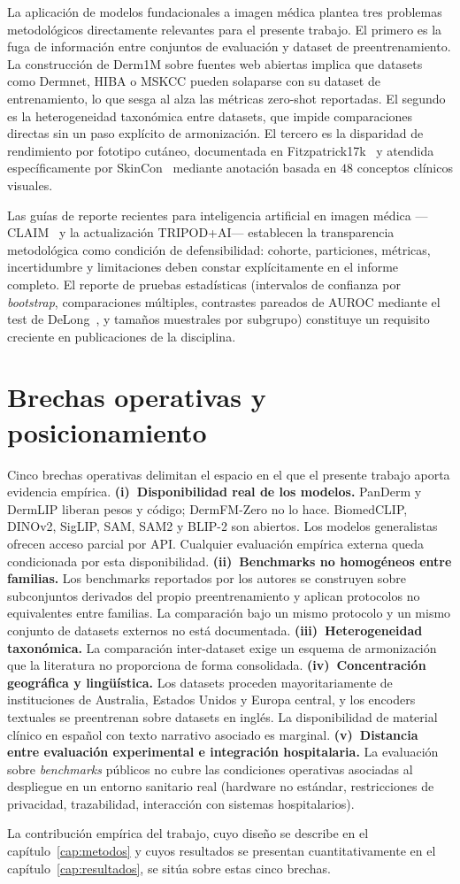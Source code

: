 La aplicación de modelos fundacionales a imagen médica plantea tres
problemas metodológicos directamente relevantes para el presente
trabajo. El primero es la fuga de información entre conjuntos de
evaluación y dataset de preentrenamiento. La construcción de Derm1M
sobre fuentes web abiertas implica que datasets como Dermnet, HIBA
o MSKCC pueden solaparse con su dataset de entrenamiento, lo que
sesga al alza las métricas zero-shot reportadas. El segundo es la
heterogeneidad taxonómica entre datasets, que impide comparaciones
directas sin un paso explícito de armonización. El tercero es la
disparidad de rendimiento por fototipo cutáneo, documentada en
Fitzpatrick17k~\cite{fitzpatrick17k} y atendida específicamente por
SkinCon~\cite{skincon} mediante anotación basada en $48$
conceptos clínicos visuales.

Las guías de reporte recientes para inteligencia artificial en
imagen médica ---CLAIM~\cite{claim2024} y la actualización
TRIPOD+AI--- establecen la transparencia metodológica como
condición de defensibilidad: cohorte, particiones, métricas,
incertidumbre y limitaciones deben constar explícitamente en el
informe completo. El reporte de pruebas estadísticas (intervalos de
confianza por \emph{bootstrap}, comparaciones múltiples,
contrastes pareados de AUROC mediante el test de
DeLong~\cite{delong1988}, y tamaños muestrales por subgrupo)
constituye un requisito creciente en publicaciones de la disciplina.

\section{Brechas operativas y posicionamiento}
\label{sec:brecha}

Cinco brechas operativas delimitan el espacio en el que el presente
trabajo aporta evidencia empírica. \textbf{(i)~Disponibilidad real
de los modelos.} PanDerm y DermLIP liberan pesos y código;
DermFM-Zero no lo hace. BiomedCLIP, DINOv2, SigLIP, SAM, SAM2 y
BLIP-2 son abiertos. Los modelos generalistas ofrecen acceso parcial
por API. Cualquier evaluación empírica externa queda condicionada
por esta disponibilidad. \textbf{(ii)~Benchmarks no homogéneos entre
familias.} Los benchmarks reportados por los autores se construyen
sobre subconjuntos derivados del propio preentrenamiento y aplican
protocolos no equivalentes entre familias. La comparación bajo un
mismo protocolo y un mismo conjunto de datasets externos no está
documentada. \textbf{(iii)~Heterogeneidad taxonómica.} La
comparación inter-dataset exige un esquema de armonización que la
literatura no proporciona de forma consolidada.
\textbf{(iv)~Concentración geográfica y lingüística.} Los datasets
proceden mayoritariamente de instituciones de Australia, Estados
Unidos y Europa central, y los encoders textuales se preentrenan
sobre datasets en inglés. La disponibilidad de material clínico en
español con texto narrativo asociado es marginal.
\textbf{(v)~Distancia entre evaluación experimental e integración
hospitalaria.} La evaluación sobre \emph{benchmarks} públicos no
cubre las condiciones operativas asociadas al despliegue en un
entorno sanitario real (hardware no estándar, restricciones de
privacidad, trazabilidad, interacción con sistemas hospitalarios).

La contribución empírica del trabajo, cuyo diseño se describe en el
capítulo~\ref{cap:metodos} y cuyos resultados se presentan
cuantitativamente en el capítulo~\ref{cap:resultados}, se sitúa
sobre estas cinco brechas.
